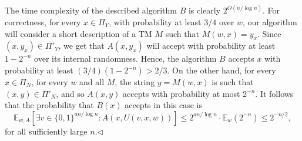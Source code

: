 The time complexity of the described algorithm $B$ is clearly $2^{O(n/\log n)}$. For correctness, for every $x\in\Pi_Y$, with probability at least $3/4$ over $w$, our algorithm will consider a short description of a TM $M$ such that $M(w,x)=y_x$. Since $(x,y_x)\in\Pi'_Y$, we get that $A(x,y_x)$ will accept with probability at least $1-2^{-n}$ over its internal randomness. Hence, the algorithm $B$ accepts $x$ with probability at least $(3/4)(1-2^{-n})>2/3$. On the other hand, for every $x\in\Pi_N$, for every $w$ and all $M$, the string $y=M(w,x)$ is such that $(x,y)\in\Pi'_N$, and so $A(x,y)$ accepts with probability at most $2^{-n}$. It follows that the probability that $B(x)$ accepts in this case is
\[\mathbb E_{w,A}[\exists v\in\{0,1\}^{an/\log n}:A(x,U(v,x,w))]\leq2^{an/\log n}\cdot\mathbb E_w(2^{-n})\leq2^{-n/2},\]
for all sufficiently large $n$.\hfill$\triangleleft$
